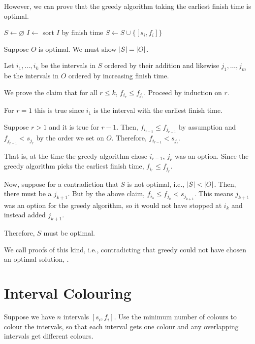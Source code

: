 However, we can prove that the greedy algorithm taking the earliest finish time is optimal.

\begin{algorithm}[H]
  \caption{}
  \begin{algorithmic}[1]
    \State $S \gets \varnothing$
    \State $I \gets$ sort $I$ by finish time
    \State $S \gets S \cup \{[s_i,f_i]\}$
    \EndIf
    \EndFor
  \end{algorithmic}
\end{algorithm}

\begin{prf}
  Suppose $O$ is optimal. We must show $\abs{S} = \abs{O}$.

  Let $i_1,\dotsc,i_k$ be the intervals in $S$ ordered by their addition
  and likewise $j_1,\dotsc,j_m$ be the intervals in $O$ ordered by increasing finish time.

  We prove the claim that for all $r \leq k$, $f_{i_r} \leq f_{j_r}$.
  Proceed by induction on $r$.

  For $r=1$ this is true since $i_1$ is the interval with the earliest finish time.

  Suppose $r > 1$ and it is true for $r-1$.
  Then, $f_{i_{r-1}} \leq f_{j_{r-1}}$ by assumption and $f_{j_{r-1}} < s_{j_r}$
  by the order we set on $O$.
  Therefore, $f_{i_{r-1}} < s_{j_r}$.

  That is, at the time the greedy algorithm chose $i_{r-1}$, $j_r$ was an option.
  Since the greedy algorithm picks the earliest finish time, $f_{i_r} \leq f_{j_r}$.

  Now, suppose for a contradiction that $S$ is not optimal, i.e., $\abs{S} < \abs{O}$.
  Then, there must be a $j_{k+1}$.
  But by the above claim, $f_{i_k} \leq f_{j_k} < s_{j_{k+1}}$.
  This means $j_{k+1}$ was an option for the greedy algorithm,
  so it would not have stopped at $i_k$ and instead added $j_{k+1}$.

  Therefore, $S$ must be optimal.
\end{prf}

We call proofs of this kind, i.e., contradicting that greedy could not have
chosen an optimal solution, .

\section{Interval Colouring}
\begin{problem}
  Suppose we have $n$ intervals $[s_i, f_i]$.
  Use the minimum number of colours to colour the intervals,
  so that each interval gets one colour
  and any overlapping intervals get different colours.
\end{problem}

